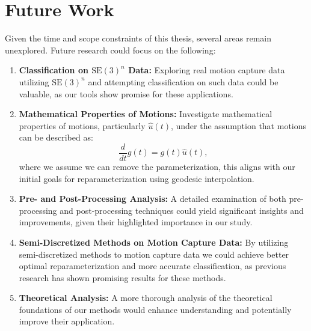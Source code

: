 \newpage
\section*{Future Work}

Given the time and scope constraints of this thesis, several areas remain unexplored. Future research could focus on the following:

\begin{enumerate}
    \item \textbf{Classification on \(\mathrm{SE}(3)^n\) Data:} Exploring real motion capture data utilizing \(\mathrm{SE}(3)^n\) and attempting classification on such data could be valuable, as our tools show promise for these applications.
    
    \item \textbf{Mathematical Properties of Motions:} Investigate mathematical properties of motions, particularly \(\hat{u}(t)\), under the assumption that motions can be described as:
    \begin{equation*}
        \frac{d}{dt} g(t) = g(t)\hat u(t),
    \end{equation*}
    where we assume we can remove the parameterization, this aligns with our initial goals for reparameterization using geodesic interpolation.
    
    \item \textbf{Pre- and Post-Processing Analysis:} A detailed examination of both pre-processing and post-processing techniques could yield significant insights and improvements, given their highlighted importance in our study.
    
    \item \textbf{Semi-Discretized Methods on Motion Capture Data:} By utilizing semi-discretized methods to motion capture data we could achieve better optimal reparameterization and more accurate classification, as previous research has shown promising results for these methods.
    
    \item \textbf{Theoretical Analysis:} A more thorough analysis of the theoretical foundations of our methods would enhance understanding and potentially improve their application.
\end{enumerate}